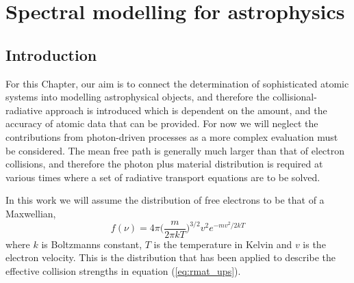 
\chapter{Spectral modelling for astrophysics} %

\label{cha:spectral} %



\section{Introduction}\label{sec:spe_intro}
For this Chapter, our aim is to connect the determination of sophisticated atomic systems into modelling astrophysical objects, and therefore the collisional-radiative approach is introduced which is dependent on the amount, and the accuracy of atomic data that can be provided. For now we will neglect the contributions from photon-driven processes as a more complex evaluation must be considered. The mean free path is generally much larger than that of electron collisions, and therefore the photon plus material distribution is required at various times where a set of radiative transport equations are to be solved.

In this work we will assume the distribution of free electrons to be that of a Maxwellian,
\begin{equation}\label{eq:spe_max}
f(\nu)= 4\pi \Big(\frac{m}{2\pi k T}\Big)^{3/2}v^{2}e^{-mv^2/2kT}
\end{equation}
where $k$ is Boltzmanns constant, $T$ is the temperature in Kelvin and $v$ is the electron velocity. This is the distribution that has been applied to describe the effective collision strengths in equation (\ref{eq:rmat_ups}).

